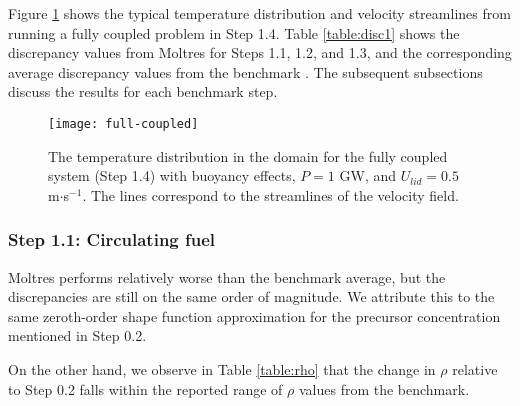 Figure \ref{fig:color} shows the typical temperature distribution and velocity
streamlines from running a fully coupled problem in Step 1.4. 
Table \ref{table:disc1} shows the discrepancy values from Moltres for Steps
1.1, 1.2, and 1.3,
and the corresponding average discrepancy values from the benchmark
\citep{tiberga_results_2020}. The subsequent subsections discuss the results
for each benchmark step.
%
\begin{figure}[h!]
  \centering
  \texttt{[image: full-coupled]}
  \caption{The temperature distribution in the domain for the fully coupled
  system (Step 1.4) with buoyancy effects, $P = 1$ GW, and $U_{lid} = 0.5$
  m$\cdot$s$^{-1}$. The lines correspond to the streamlines of the velocity
  field.}
  \label{fig:color}
\end{figure}

\subsubsection{Step 1.1: Circulating fuel}

Moltres performs relatively worse than the benchmark average, but the
discrepancies are still on the same order of magnitude. We attribute this to
the same zeroth-order shape function approximation for the precursor
concentration mentioned in Step 0.2.

On the other hand, we observe in Table \ref{table:rho} that the change in
$\rho$ relative to Step 0.2 falls within the reported range of $\rho$ values
from the benchmark.

